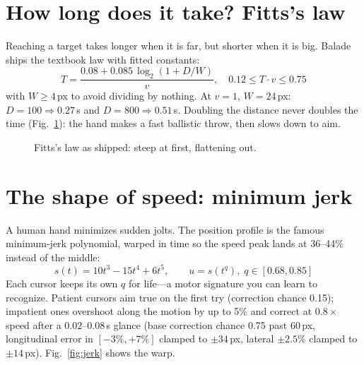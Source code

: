 \documentclass[10pt,conference]{IEEEtran}
\begin{document}
\section{How long does it take? Fitts's law}
Reaching a target takes longer when it is far, but shorter when it is big.
Balade ships the textbook law with fitted constants:
\begin{equation}
T = \frac{0.08 + 0.085\,\log_2(1 + D/W)}{v}, \quad 0.12 \le T\cdot v \le 0.75
\end{equation}
with $W \ge 4$\,px to avoid dividing by nothing. At $v=1$, $W=24$\,px:
$D=100 \Rightarrow 0.27$\,s and $D=800 \Rightarrow 0.51$\,s. Doubling the
distance never doubles the time (Fig.~\ref{fig:fitts}): the hand makes a fast
ballistic throw, then slows down to aim.

\begin{figure}[h]
\centering
{}
\caption{Fitts's law as shipped: steep at first, flattening out.}
\label{fig:fitts}
\end{figure}

\section{The shape of speed: minimum jerk}
A human hand minimizes sudden jolts. The position profile is the famous
minimum-jerk polynomial, warped in time so the speed peak lands at 36--44\%
instead of the middle:
\begin{equation}
s(t) = 10t^3 - 15t^4 + 6t^5, \qquad u = s(t^q),\; q \in [0.68, 0.85]
\end{equation}
Each cursor keeps its own $q$ for life---a motor signature you can learn to
recognize. Patient cursors aim true on the first try (correction chance 0.15);
impatient ones overshoot along the motion by up to 5\% and correct at
$0.8\times$ speed after a $0.02$--$0.08$\,s glance (base correction chance 0.75
past 60\,px, longitudinal error in $[-3\%, +7\%]$ clamped to $\pm34$\,px,
lateral $\pm2.5\%$ clamped to $\pm14$\,px). Fig.~\ref{fig:jerk} shows the warp.
\end{document}
